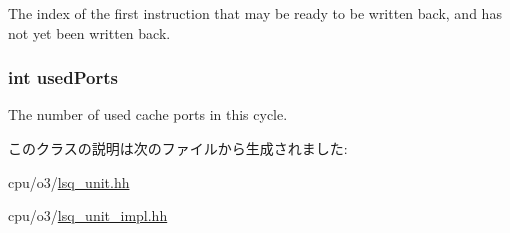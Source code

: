 \label{classLSQUnit_a9023e0813d4f3e566d17fb6334a2da02}
The index of the first instruction that may be ready to be written back, and has not yet been written back. \hypertarget{classLSQUnit_a03435d626b7567ed154de5d7d8c3d419}{
\subsubsection[{usedPorts}]{\setlength{\rightskip}{0pt plus 5cm}int {\bf usedPorts}}}
\label{classLSQUnit_a03435d626b7567ed154de5d7d8c3d419}
The number of used cache ports in this cycle. 

このクラスの説明は次のファイルから生成されました:\begin{DoxyCompactItemize}
\item 
cpu/o3/\hyperlink{o3_2lsq__unit_8hh}{lsq\_\-unit.hh}\item 
cpu/o3/\hyperlink{o3_2lsq__unit__impl_8hh}{lsq\_\-unit\_\-impl.hh}\end{DoxyCompactItemize}
